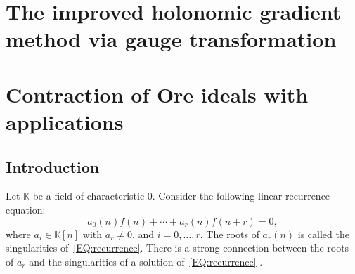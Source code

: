 \documentclass[10pt,a4paper]{article}
\newcommand{\bK}{ {\mathbb  K}}
\begin{document}
\section*{The improved holonomic gradient method via gauge transformation} \label{SECT:hgm}


\section{Contraction of Ore ideals with applications} \label{SECT:contraction}

\subsection{Introduction}
Let $\bK$ be a field of characteristic $0$. 
Consider the following linear recurrence equation:
\begin{equation} \label{EQ:recurrence}
 a_0(n)f(n) + \cdots + a_r(n)f(n+r)=0,
\end{equation}
where $a_i \in \bK[n]$ with $a_r \neq 0$, and $i = 0, \ldots, r$. The roots of $a_r(n)$ is called 
the singularities of~\eqref{EQ:recurrence}.  
There is a strong connection between the roots of $a_r$ 
and the singularities of a solution of~\eqref{EQ:recurrence} . 
\end{document}
